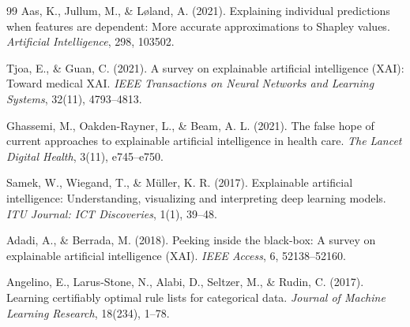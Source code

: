 \documentclass[journal]{IEEEtran}
\begin{document}
\begin{thebibliography}{99}
Aas, K., Jullum, M., \& Løland, A. (2021). Explaining individual predictions when features are dependent: More accurate approximations to Shapley values. \textit{Artificial Intelligence}, 298, 103502.

Tjoa, E., \& Guan, C. (2021). A survey on explainable artificial intelligence (XAI): Toward medical XAI. \textit{IEEE Transactions on Neural Networks and Learning Systems}, 32(11), 4793--4813.

Ghassemi, M., Oakden-Rayner, L., \& Beam, A. L. (2021). The false hope of current approaches to explainable artificial intelligence in health care. \textit{The Lancet Digital Health}, 3(11), e745--e750.

Samek, W., Wiegand, T., \& Müller, K. R. (2017). Explainable artificial intelligence: Understanding, visualizing and interpreting deep learning models. \textit{ITU Journal: ICT Discoveries}, 1(1), 39--48.

Adadi, A., \& Berrada, M. (2018). Peeking inside the black-box: A survey on explainable artificial intelligence (XAI). \textit{IEEE Access}, 6, 52138--52160.

Angelino, E., Larus-Stone, N., Alabi, D., Seltzer, M., \& Rudin, C. (2017). Learning certifiably optimal rule lists for categorical data. \textit{Journal of Machine Learning Research}, 18(234), 1--78.

\end{thebibliography}
\end{document}

